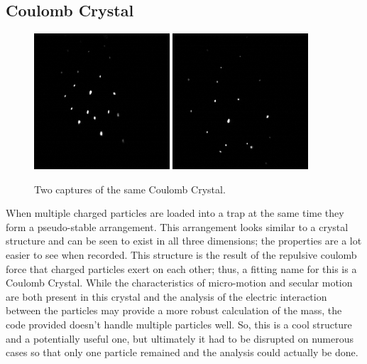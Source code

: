 \documentclass[12pt]{article}
\begin{document}
\subsection{Coulomb Crystal}
\begin{figure}[!ht]
\centering
    \includegraphics[width=0.45\textwidth]{crystal_1.PNG}
    \includegraphics[width=0.45\textwidth]{crystal_2.PNG}
	\caption{Two captures of the same Coulomb Crystal.}
    \label{fig:crystals}
\end{figure}

When multiple charged particles are loaded into a trap at the same time they form a pseudo-stable arrangement. This arrangement looks similar to a crystal structure and can be seen to exist in all three dimensions; the properties are a lot easier to see when recorded. This structure is the result of the repulsive coulomb force that charged particles exert on each other; thus, a fitting name for this is a Coulomb Crystal. While the characteristics of micro-motion and secular motion are both present in this crystal and the analysis of the electric interaction between the particles may provide a more robust calculation of the mass, the code provided doesn't handle multiple particles well. So, this is a cool structure and a potentially useful one, but ultimately it had to be disrupted on numerous cases so that only one particle remained and the analysis could actually be done. 
\end{document}
